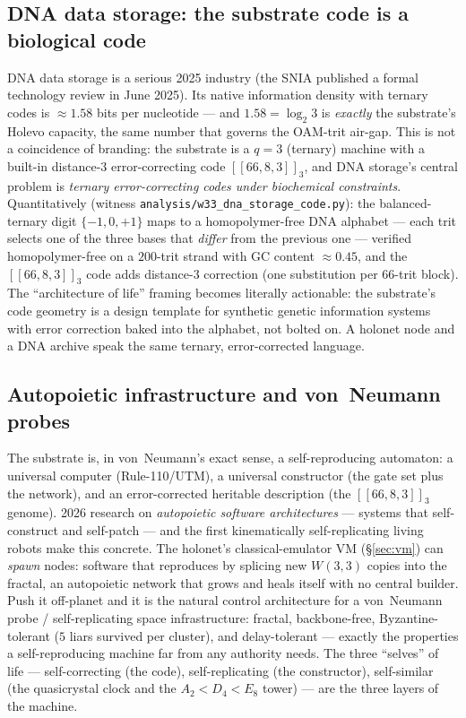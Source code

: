 \documentclass[11pt]{article}
\begin{document}
\subsection{DNA data storage: the substrate code is a biological code}
DNA data storage is a serious 2025 industry (the SNIA published a formal technology review in June
2025). Its native information density with ternary codes is $\approx 1.58$ bits per nucleotide --- and
$1.58 = \log_2 3$ is \emph{exactly} the substrate's Holevo capacity, the same number that governs the
OAM-trit air-gap. This is not a coincidence of branding: the substrate is a $q=3$ (ternary) machine
with a built-in distance-$3$ error-correcting code $[[66,8,3]]_3$, and DNA storage's central problem is
\emph{ternary error-correcting codes under biochemical constraints}. Quantitatively (witness
\texttt{analysis/w33\_dna\_storage\_code.py}): the balanced-ternary digit $\{-1,0,+1\}$ maps to a
homopolymer-free DNA alphabet --- each trit selects one of the three bases that \emph{differ} from the
previous one --- verified homopolymer-free on a $200$-trit strand with GC content $\approx 0.45$, and
the $[[66,8,3]]_3$ code adds distance-$3$ correction (one substitution per $66$-trit block). The
``architecture of life'' framing becomes literally actionable: the substrate's code geometry is a design
template for synthetic genetic information systems with error correction baked into the alphabet, not
bolted on. A holonet node and a DNA archive speak the same ternary, error-corrected language.

\subsection{Autopoietic infrastructure and von~Neumann probes}
The substrate is, in von~Neumann's exact sense, a self-reproducing automaton: a universal computer
(Rule-110/UTM), a universal constructor (the gate set plus the network), and an error-corrected
heritable description (the $[[66,8,3]]_3$ genome). 2026 research on \emph{autopoietic software
architectures} --- systems that self-construct and self-patch --- and the first kinematically
self-replicating living robots make this concrete. The holonet's classical-emulator VM (\S\ref{sec:vm})
can \emph{spawn} nodes: software that reproduces by splicing new $W(3,3)$ copies into the fractal, an
autopoietic network that grows and heals itself with no central builder. Push it off-planet and it is
the natural control architecture for a von~Neumann probe / self-replicating space infrastructure:
fractal, backbone-free, Byzantine-tolerant ($5$ liars survived per cluster), and delay-tolerant ---
exactly the properties a self-reproducing machine far from any authority needs. The three ``selves''
of life --- self-correcting (the code), self-replicating (the constructor), self-similar (the
quasicrystal clock and the $A_2{<}D_4{<}E_8$ tower) --- are the three layers of the machine.
\end{document}

